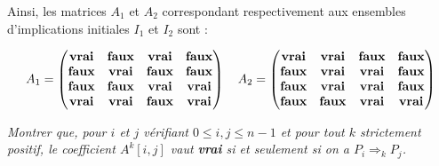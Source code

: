 Ainsi, les matrices $A_1$ et $A_2$ correspondant respectivement aux ensembles d'implications initiales $I_1$ et $I_2$ sont :
    
\[A_1 = \begin{pmatrix} {\bf vrai} & {\bf faux} & {\bf vrai} & {\bf faux} \\ 
                        {\bf faux} & {\bf vrai} & {\bf faux} & {\bf faux} \\
                        {\bf faux} & {\bf faux} & {\bf vrai} & {\bf vrai} \\ 
                        {\bf vrai} & {\bf vrai} & {\bf faux} & {\bf vrai} \end{pmatrix}
\quad A_2 = \begin{pmatrix} {\bf vrai} & {\bf vrai} & {\bf faux} & {\bf faux} \\
                            {\bf faux} & {\bf vrai} & {\bf vrai} & {\bf faux} \\
                            {\bf faux} & {\bf vrai} & {\bf vrai} & {\bf faux} \\
                            {\bf faux} & {\bf faux} & {\bf vrai} & {\bf vrai}
                            \end{pmatrix}\]
\begin{Exercise}\it
Montrer que, pour $i$ et $j$ vérifiant  $0 \le  i, j \le  n - 1$ et pour tout $k$ strictement positif, le coefficient $A^k[i, j]$ vaut {\bf vrai} si et seulement si on a $P_{i} \Rightarrow_{k} P_{j}$.
\end{Exercise}
